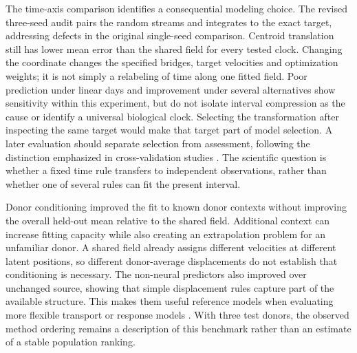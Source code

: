 The time-axis comparison identifies a consequential modeling choice. The revised three-seed audit pairs the random streams and integrates to the exact target, addressing defects in the original single-seed comparison. Centroid translation still has lower mean error than the shared field for every tested clock. Changing the coordinate changes the specified bridges, target velocities and optimization weights; it is not simply a relabeling of time along one fitted field. Poor prediction under linear days and improvement under several alternatives show sensitivity within this experiment, but do not isolate interval compression as the cause or identify a universal biological clock. Selecting the transformation after inspecting the same target would make that target part of model selection. A later evaluation should separate selection from assessment, following the distinction emphasized in cross-validation studies \citep{varma2006,cawley2010}. The scientific question is whether a fixed time rule transfers to independent observations, rather than whether one of several rules can fit the present interval.

Donor conditioning improved the fit to known donor contexts without improving the overall held-out mean relative to the shared field. Additional context can increase fitting capacity while also creating an extrapolation problem for an unfamiliar donor. A shared field already assigns different velocities at different latent positions, so different donor-average displacements do not establish that conditioning is necessary. The non-neural predictors also improved over unchanged source, showing that simple displacement rules capture part of the available structure. This makes them useful reference models when evaluating more flexible transport or response models \citep{bunne2023}. With three test donors, the observed method ordering remains a description of this benchmark rather than an estimate of a stable population ranking.

